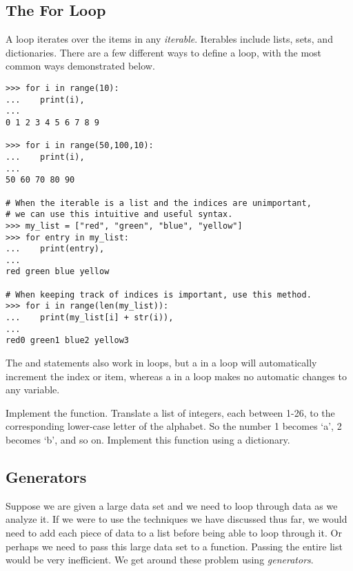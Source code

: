 \subsection*{The For Loop}
A  loop iterates over the items in any \emph{iterable}.
Iterables include lists, sets, and dictionaries.
There are a few different ways to define a  loop, with the most common ways demonstrated below.

\begin{lstlisting}
>>> for i in range(10):
...    print(i),
...     
0 1 2 3 4 5 6 7 8 9

>>> for i in range(50,100,10):
...    print(i),
...
50 60 70 80 90

# When the iterable is a list and the indices are unimportant,
# we can use this intuitive and useful syntax.
>>> my_list = ["red", "green", "blue", "yellow"]
>>> for entry in my_list:
...    print(entry),
...
red green blue yellow

# When keeping track of indices is important, use this method.
>>> for i in range(len(my_list)):
...    print(my_list[i] + str(i)),
...
red0 green1 blue2 yellow3
\end{lstlisting}

The  and  statements also work in  loops, but a  in a  loop will automatically increment the index or item, whereas a  in a  loop makes no automatic changes to any variable.

\begin{problem}
Implement the  function. Translate a list of integers, each between 1-26, to the corresponding lower-case letter of the alphabet.
So the number 1 becomes `a', 2 becomes `b', and so on.
Implement this function using a dictionary.
\end{problem}


\subsection*{Generators}

Suppose we are given a large data set and we need to loop through data as we analyze it.
If we were to use the techniques we have discussed thus far, we would need to add each piece of data to a list before being able to loop through it.
Or perhaps we need to pass this large data set to a function.
Passing the entire list would be very inefficient.
We get around these problem using \emph{generators}.

